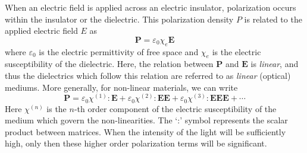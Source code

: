 \documentclass[%
 reprint,
 amsmath,amssymb,
 aps,
]{revtex4-2}
\begin{document}
	When an electric field is applied across an electric insulator, polarization occurs within the insulator or the dielectric. This polarization density $ P $ is related to the applied electric field $ E $ as
	\begin{equation}
		\mathbf{P} = \varepsilon_0 \chi_e \mathbf{E}
	\end{equation}
	where $ \varepsilon_0 $ is the electric permittivity of free space and $ \chi_e $ is the electric susceptibility of the dielectric. Here, the relation between $ \mathbf{P} $ and $ \mathbf{E} $ is \textit{linear}, and thus the dielectrics which follow this relation are referred to as \textit{linear} (optical) mediums. More generally, for non-linear materials, we can write
	\begin{equation}\label{eq:2}
		\mathbf{P} = \varepsilon_0 \chi^{(1)} : \mathbf{E} + \varepsilon_0 \chi^{(2)} : \mathbf{EE} + \varepsilon_0 \chi^{(3)} : \mathbf{EEE} + \cdots
	\end{equation}
	Here $ \chi^{(n)} $ is the $ n $-th order component of the electric susceptibility of the medium which govern the non-linearities. The `:' symbol represents the scalar product between matrices. When the intensity of the light will be sufficiently high, only then
	these higher order polarization terms will be significant.
	
\end{document}
